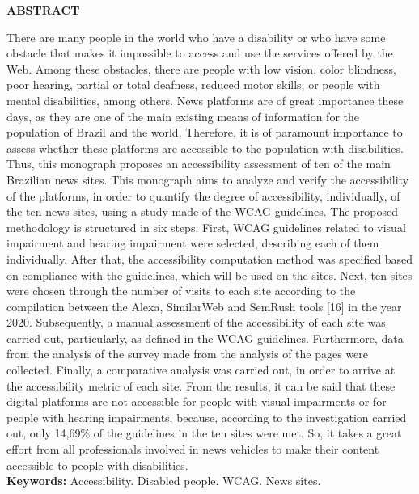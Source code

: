 \documentclass[a4paper]{article}
\begin{document}
\begin{titlepage}
	\begin{center}
		{\large \textbf{ABSTRACT}}\\[1cm]
	\end{center}
	\fontsize{12pt}{0pt}\selectfont
	\onehalfspacing
	There are many people in the world who have a disability or who have some obstacle that makes it impossible to access and use the services offered by the Web. Among these obstacles, there are people with low vision, color blindness, poor hearing, partial or total deafness, reduced motor skills, or people with mental disabilities, among others. News platforms are of great importance these days, as they are one of the main existing means of information for the population of Brazil and the world. Therefore, it is of paramount importance to assess whether these platforms are accessible to the population with disabilities. Thus, this monograph proposes an accessibility assessment of ten of the main Brazilian news sites. This monograph aims to analyze and verify the accessibility of the platforms, in order to quantify the degree of accessibility, individually, of the ten news sites, using a study made of the WCAG guidelines. The proposed methodology is structured in six steps. First, WCAG guidelines related to visual impairment and hearing impairment were selected, describing each of them individually. After that, the accessibility computation method was specified based on compliance with the guidelines, which will be used on the sites. Next, ten sites were chosen through the number of visits to each site according to the compilation between the Alexa, SimilarWeb and SemRush tools [16] in the year 2020. Subsequently, a manual assessment of the accessibility of each site was carried out, particularly, as defined in the WCAG guidelines. Furthermore, data from the analysis of the survey made from the analysis of the pages were collected. Finally, a comparative analysis was carried out, in order to arrive at the accessibility metric of each site. From the results, it can be said that these digital platforms are not accessible for people with visual impairments or for people with hearing impairments, because, according to the investigation carried out, only 14,69\% of the guidelines in the ten sites were met. So, it takes a great effort from all professionals involved in news vehicles to make their content accessible to people with disabilities.\\[1cm]
	{\large \textbf{Keywords: }}Accessibility. Disabled people. WCAG. News sites.\\[1cm]
\end{titlepage}
\end{document}
